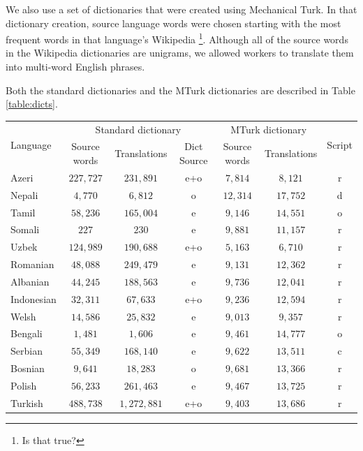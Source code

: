 \documentclass[11pt]{article}
\begin{document}
We also use a set of dictionaries that were created using Mechanical Turk. In that dictionary creation, source language words were chosen starting with the most frequent words in that language's Wikipedia \footnote{Is that true?}. Although all of the source words in the Wikipedia dictionaries are unigrams, we allowed workers to translate them into multi-word English phrases. 

Both the standard dictionaries and the MTurk dictionaries are described in Table \ref{table:dicts}.

\begin{table}\footnotesize
\begin{center}
\begin{tabular}{|l||c|c|c||c|c||c|}
\hline
\multirow{2}{*}{Language} & \multicolumn{3}{|c||}{Standard dictionary} & \multicolumn{2}{|c||}{MTurk dictionary} & \multirow{2}{*}{Script}\\ \cline{2-6}
& Source words &Translations & Dict Source & Source words & Translations & \\
\hline
Azeri  & $227,727$ & $231,891$ &  e+o & $7,814$ & $8,121$ & r \\
Nepali  & $4,770$ & $6,812$ &  o & $12,314$ & $17,752$ & d \\
Tamil  & $58,236$ & $165,004$ &   e  & $9,146$ & $14,551$ & o \\
Somali  & $227$ & $230$ &   e & $9,881$ & $11,157$ & r \\
Uzbek  & $124,989$ & $190,688$ & e+o & $5,163$ & $6,710$ & r \\
Romanian  & $48,088$ & $249,479$ &  e & $9,131$ & $12,362$ & r \\
Albanian  & $44,245$ & $188,563$ &  e  & $9,736$ & $12,041$ & r\\
Indonesian  & $32,311$ &  $67,633$ & e+o & $9,236$ & $12,594$ & r\\
Welsh  & $14,586$ &  $25,832$ &   e & $9,013$ & $9,357$ & r\\
Bengali  & $1,481$ & $1,606$   & e & $9,461$ & $14,777$ & o \\
Serbian  &  $55,349$ & $168,140$ & e & $9,622$ & $13,511$ & c\\
Bosnian    & $9,641$ & $18,283$ & o & $9,681$ & $13,366$ & r\\
Polish  & $56,233$ &  $261,463$ &   e & $9,467$ &  $13,725$ & r\\
Turkish  & $488,738$ &  $1,272,881$  & e+o & $9,403$ &  $13,686$ & r \\

\end{tabular}
\end{center}
\end{table}
\end{document}
